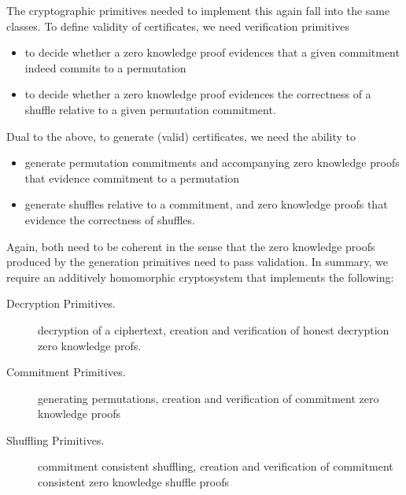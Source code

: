 \documentclass{llncs}
\begin{document}
\noindent
The cryptographic primitives needed to implement this again fall
into the same classes. To define validity of certificates, we need
verification primitives
\begin{itemize}
  \item to decide whether a zero knowledge proof evidences that a
  given commitment indeed commits to a permutation 
  \item to decide whether a zero knowledge proof evidences the
  correctness of a shuffle relative to a given permutation
  commitment.
\end{itemize}

\noindent
Dual to the above, to generate (valid) certificates, we need the
ability to
\begin{itemize}
  \item generate permutation commitments and accompanying zero
  knowledge proofs that evidence commitment to a permutation
  \item generate shuffles relative to a commitment, and zero
  knowledge proofs that evidence the correctness of shuffles.
\end{itemize}

\noindent
Again, both need to be coherent in the sense that the zero knowledge
proofs produced by the generation primitives need to pass
validation. In summary, we require an additively homomorphic
cryptosystem that implements the following:

\begin{description}
\item[Decryption Primitives.]
  decryption of a ciphertext, creation and verification of
  honest decryption zero knowledge profs.
\item[Commitment Primitives.]
  generating permutations, creation and verification of commitment
  zero knowledge proofs
\item[Shuffling Primitives.]
  commitment consistent shuffling, creation and verification of
  commitment consistent zero knowledge shuffle proofs 
\end{description}
\end{document}

